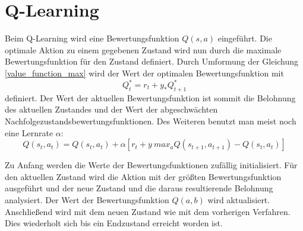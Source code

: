 \section{Q-Learning} %
\label{sec:q_learning}

Beim Q-Learning wird eine Bewertungsfunktion $Q(s, a)$ eingeführt. Die optimale Aktion zu einem gegebenen Zustand wird nun durch die maximale Bewertungsfunktion für den Zustand definiert. Durch Umformung der Gleichung \ref{value_function_max} wird der Wert der optimalen Bewertungsfunktion mit
\begin{equation}
	Q^{*}_t = r_t + y_*Q^{*}_{t+1}
\end{equation} 
definiert. Der Wert der aktuellen Bewertungsfunktion ist sommit die Belohnung des aktuellen Zustandes und der Wert der abgeschwächten Nachfolgezustandsbewertungsfunktionen. Des Weiteren benutzt man meist noch eine Lernrate $\alpha$:
\begin{equation}
	Q(s_t, a_t) = Q(s_t, a_t) + \alpha[r_t + y \ max_a Q(s_{t+1}, a_{t+1}) - Q(s_t, a_t)]
\end{equation} \cite{Ertel_2013} \par
Zu Anfang werden die Werte der Bewertungsfunktionen zufällig initialisiert. Für den aktuellen Zustand wird die Aktion mit der größten Bewertungsfunktion ausgeführt und der neue Zustand und die daraus resultierende Belohnung analysiert. Der Wert der Bewertungsfunktion $Q(a, b)$ wird aktualisiert. Anschließend wird mit dem neuen Zustand wie mit dem vorherigen Verfahren. Dies wiederholt sich bis ein Endzustand erreicht worden ist. \cite{Ertel_2013}

